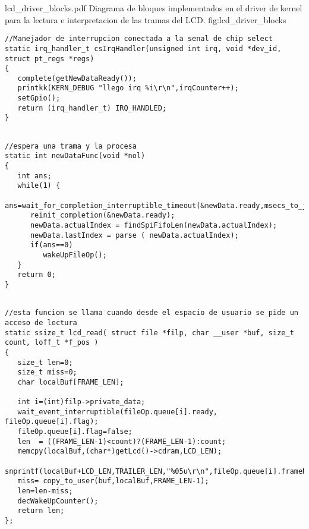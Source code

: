          {lcd_driver_blocks.pdf}
         {Diagrama de bloques implementados en el driver de kernel para la lectura e interpretacion de las tramas del LCD.}
         {fig:lcd_driver_blocks}

         \begin{lstlisting}[caption={Fragmentos de codigo del modulo implementado para recibir y procesar las tramas de datos del LCD.},label={cod:lcd_driver}]
//Manejador de interrupcion conectada a la senal de chip select
static irq_handler_t csIrqHandler(unsigned int irq, void *dev_id, struct pt_regs *regs)
{
   complete(getNewDataReady());
   printkk(KERN_DEBUG "llego irq %i\r\n",irqCounter++);
   setGpio();
   return (irq_handler_t) IRQ_HANDLED;
}
\end{lstlisting}

\begin{lstlisting}[caption={},label={cod:lcd_driver},title={\lstlistingname~\thelstlisting: Fragmentos de codigo del modulo implementado para recibir y procesar las tramas de datos del LCD. (continued)}] 

//espera una trama y la procesa
static int newDataFunc(void *nol)
{
   int ans;
   while(1) {
      ans=wait_for_completion_interruptible_timeout(&newData.ready,msecs_to_jiffies(param_newDataTout));
      reinit_completion(&newData.ready);
      newData.actualIndex = findSpiFifoLen(newData.actualIndex);
      newData.lastIndex = parse ( newData.actualIndex);
      if(ans==0)
         wakeUpFileOp();
   }
   return 0;
}
\end{lstlisting}

\begin{lstlisting}[name={caption},caption={},label=cod:lcd_driver,title={\lstlistingname~\thelstlisting: Fragmentos de codigo del modulo implementado para recibir y procesar las tramas de datos del LCD. (continued)}] 

//esta funcion se llama cuando desde el espacio de usuario se pide un acceso de lectura
static ssize_t lcd_read( struct file *filp, char __user *buf, size_t count, loff_t *f_pos )
{
   size_t len=0;
   size_t miss=0;
   char localBuf[FRAME_LEN];

   int i=(int)filp->private_data;
   wait_event_interruptible(fileOp.queue[i].ready, fileOp.queue[i].flag);
   fileOp.queue[i].flag=false;
   len  = ((FRAME_LEN-1)<count)?(FRAME_LEN-1):count;
   memcpy(localBuf,(char*)getLcd()->cdram,LCD_LEN);
   snprintf(localBuf+LCD_LEN,TRAILER_LEN,"%05u\r\n",fileOp.queue[i].frameNumber++);
   miss= copy_to_user(buf,localBuf,FRAME_LEN-1);
   len=len-miss;
   decWakeUpCounter();
   return len;
};


\end{lstlisting}


